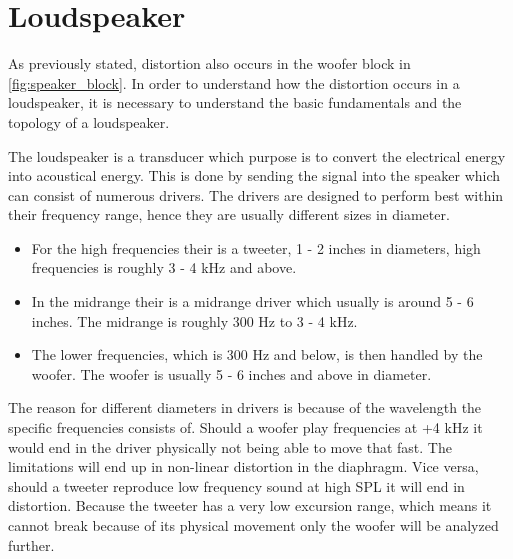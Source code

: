\section{Loudspeaker}

As previously stated, distortion also occurs in the woofer block in \autoref{fig:speaker_block}. In order to understand how the distortion occurs in a loudspeaker, it is necessary to understand the basic fundamentals and the topology of a loudspeaker. %

The loudspeaker is a transducer which purpose is to convert the electrical energy into acoustical energy. This is done by sending the signal into the speaker which can consist of numerous drivers. The drivers are designed to perform best within their frequency range, hence they are usually different sizes in diameter.
\begin{itemize}
\item[] For the high frequencies their is a tweeter, 1 - 2 inches in diameters, high frequencies is roughly 3 - 4 kHz and above.
\item[] In the midrange their is a midrange driver which usually is around 5 - 6 inches. The midrange is roughly 300 Hz to 3 - 4 kHz. 
\item[] The lower frequencies, which is 300 Hz and below, is then handled by the woofer. The woofer is usually 5 - 6 inches and above in diameter.
\end{itemize}
The reason for different diameters in drivers is because of the wavelength the specific frequencies consists of. Should a woofer play frequencies at +4 kHz it would end in the driver physically not being able to move that fast. The limitations will end up in non-linear distortion in the diaphragm. Vice versa, should a tweeter reproduce low frequency sound at high \gls{SPL} it will end in distortion. %
Because the tweeter has a very low excursion range, which means it cannot break because of its physical movement only the woofer will be analyzed further. 



